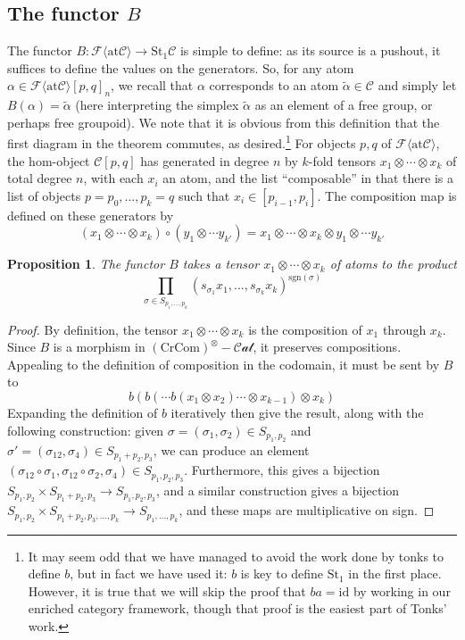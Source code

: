 \documentclass[12pt]{article}
\newtheorem{proposition}[theorem]{Proposition}
\theoremstyle{definition}
\newcommand{\C}{\mathcal{C}}
\newcommand{\crcom}{\text{CrCom}}
\newcommand{\tensorcrossedcat}{(\crcom)^\otimes-\mathcal{Cat}}
\newcommand{\id}{\text{id}}
\newcommand{\freeatom}[1]{\mathcal{F}\langle \text{at}{#1}\rangle}
\begin{document}
\subsection{The functor $B$}
	The functor $B: \mathcal{F}\langle \text{at}\C\rangle \to \text{St}_1\C$ is simple to define: as its source is a pushout, it suffices to define the values on the generators. So, for any atom $\alpha \in \freeatom{\C}[p,q]_n$, we recall that $\alpha$ corresponds to an atom $\tilde{\alpha} \in \C$ and simply let $B(\alpha) = \tilde{\alpha}$ (here interpreting the simplex $\tilde{\alpha}$ as an element of a free group, or perhaps free groupoid). We note that it is obvious from this definition that the first diagram in the theorem commutes, as desired.\footnote{It may seem odd that we have managed to avoid the work done by tonks to define $b$, but in fact we have used it: $b$ is key to define $\text{St}_1$ in the first place. However, it is true that we will skip the proof that $ba = \id$ by working in our enriched category framework, though that proof is the easiest part of Tonks' work.}
	For objects $p,q$ of $\freeatom{\C}$, the hom-object $\C[p,q]$ has generated in degree $n$ by $k$-fold tensors $x_1 \otimes \cdots \otimes x_k$ of total degree $n$, with each $x_i$ an atom, and the list ``composable'' in that there is a list of objects $p = p_0,...,p_k = q$ such that $x_i \in [p_{i-1}, p_i]$. The composition map is defined on these generators by 
	$$(x_1 \otimes \cdots \otimes x_k) \circ (y_1 \otimes \cdots y_{k'}) = x_1 \otimes \cdots \otimes x_k \otimes y_1 \otimes \cdots y_{k'}$$
\begin{proposition}
	The functor $B$ takes a tensor $x_1 \otimes \cdots \otimes x_k$ of atoms to the product
	$$\prod_{\sigma \in S_{p_1,...,p_k}} (s_{\sigma_1}x_1 ,..., s_{\sigma_k} x_k)^{\text{sgn}(\sigma)}$$
\end{proposition}
\begin{proof}
	By definition, the tensor $x_1 \otimes \cdots \otimes x_k$ is the composition of $x_1$ through $x_k$. Since $B$ is a morphism in $\tensorcrossedcat$, it preserves compositions. Appealing to the definition of composition in the codomain, it must be sent by $B$ to
$$
b(b(\cdots b(x_1 \otimes x_2) \cdots \otimes x_{k-1}) \otimes  x_k)
$$
Expanding the definition of $b$ iteratively then give the result, along with the following construction: given $\sigma = (\sigma_1,\sigma_2) \in S_{p_1,p_2}$ and $\sigma' = (\sigma_{12},\sigma_4) \in S_{p_1 + p_2,p_3}$, we can produce an element $(\sigma_{12}\circ\sigma_1, \sigma_{12} \circ \sigma_2, \sigma_4) \in S_{p_1,p_2,p_3}$. Furthermore, this gives a bijection $S_{p_1,p_2} \times S_{p_1 + p_2, p_3} \to S_{p_1,p_2,p_3}$, and a similar construction gives a bijection $S_{p_1,p_2} \times S_{p_1 + p_2,p_3,...,p_k} \to S_{p_1,...,p_k}$, and these maps are multiplicative on sign.
\end{proof}
\end{document}
